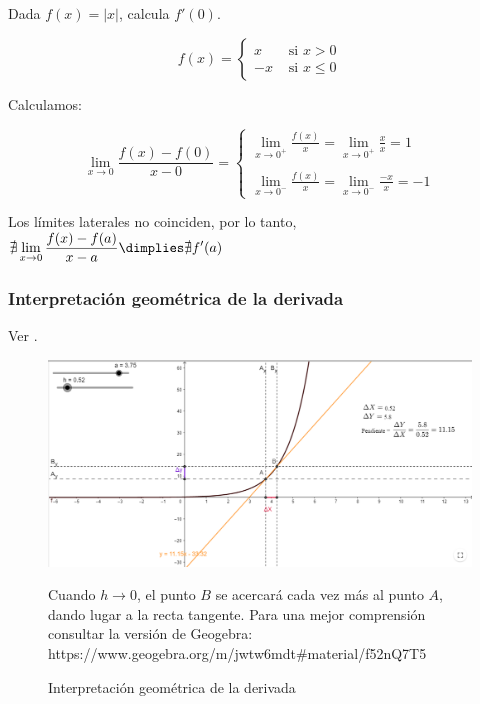 \begin{example}
Dada $f(x) = |x|$, calcula $f'(0)$.

\[
f(x) = \begin{cases}x&\text{ si } x>0 \\ -x & \text{ si }x\leq 0\end{cases}
\]

Calculamos:

\[
\lim_{x\to 0}\frac{f(x)-f(0)}{x-0} = \begin{cases}
\displaystyle\lim_{x\to 0^+} \frac{f(x)}{x} = \displaystyle\lim_{x\to 0^+} \frac{x}{x} = 1\\\\
\displaystyle\lim_{x\to 0^-} \frac{f(x)}{x} = \displaystyle\lim_{x\to 0^-} \frac{-x}{x} = -1
\end{cases}
\]

\label{derivEjemplo}

Los límites laterales no coinciden, por lo tanto, $\nexists \displaystyle\lim_{x\to 0}\frac{f(x)-f(a)}{x-a} \dimplies \nexists f'(a)$
\end{example}

\subsubsection{Interpretación geométrica de la derivada}

Ver .

\begin{figure}[hbpt!]
\centering
\includegraphics[scale=0.5]{img/DerivadaInterGeometrica.PNG}
\label{fig::funinterpretacionderivadapunto}
\caption{Interpretación geométrica de la derivada} Cuando $h\to0$, el punto $B$ se acercará cada vez más al punto $A$, dando lugar a la recta tangente. 
%
Para una mejor comprensión consultar la versión de Geogebra: https://www.geogebra.org/m/jwtw6mdt\#material/f52nQ7T5

\end{figure} 


